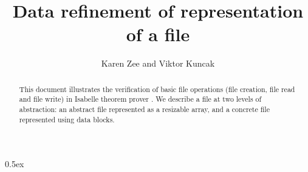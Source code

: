 \documentclass[11pt,a4paper]{article}
\begin{document}
\title{Data refinement of representation of a file}
\author{Karen Zee and Viktor Kuncak}
\maketitle

\begin{abstract}
  This document illustrates the verification of basic file
  operations (file creation, file read and file write) in
  Isabelle theorem prover \cite{LNCS2283}.  We describe a
  file at two levels of abstraction: an abstract file
  represented as a resizable array, and a concrete file
  represented using data blocks.
\end{abstract}

\tableofcontents

\parindent 0pt\parskip 0.5ex







\end{document}

